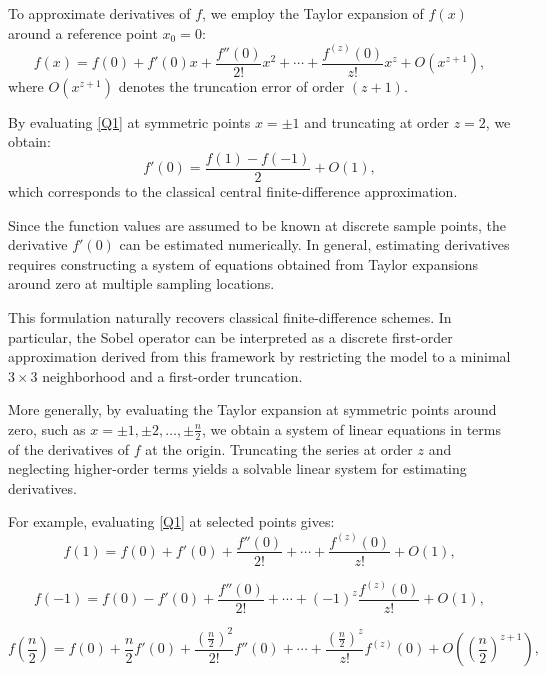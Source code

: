 \documentclass{elsarticle}
\begin{document}
To approximate derivatives of $f$, we employ the Taylor expansion of $f(x)$ around a reference point $x_0 = 0$:
\begin{equation}\label{Q1}
	f(x) = f(0) + f'(0)x + \frac{f''(0)}{2!}x^2 + \cdots + \frac{f^{(z)}(0)}{z!}x^z + O(x^{z+1}),
\end{equation}
where $O(x^{z+1})$ denotes the truncation error of order $(z+1)$.

By evaluating \eqref{Q1} at symmetric points $x = \pm 1$ and truncating at order $z = 2$, we obtain:
\begin{equation}\label{Q2}
	f'(0) = \frac{f(1) - f(-1)}{2} + O(1),
\end{equation}
which corresponds to the classical central finite-difference approximation.

Since the function values are assumed to be known at discrete sample points, the derivative $f'(0)$ can be estimated numerically. In general, estimating derivatives requires constructing a system of equations obtained from Taylor expansions around zero at multiple sampling locations.

This formulation naturally recovers classical finite-difference schemes. In particular, the Sobel operator can be interpreted as a discrete first-order approximation derived from this framework by restricting the model to a minimal $3 \times 3$ neighborhood and a first-order truncation.

More generally, by evaluating the Taylor expansion at symmetric points around zero, such as $x = \pm 1, \pm 2, \ldots, \pm \frac{n}{2}$, we obtain a system of linear equations in terms of the derivatives of $f$ at the origin. Truncating the series at order $z$ and neglecting higher-order terms yields a solvable linear system for estimating derivatives.

For example, evaluating \eqref{Q1} at selected points gives:
\begin{equation}\label{Q3}
	f(1) = f(0) + f'(0) + \frac{f''(0)}{2!} + \cdots + \frac{f^{(z)}(0)}{z!} + O(1),
\end{equation}

\begin{equation}\label{Q4}
	f(-1) = f(0) - f'(0) + \frac{f''(0)}{2!} + \cdots + (-1)^z \frac{f^{(z)}(0)}{z!} + O(1),
\end{equation}

\begin{equation}\label{Q5}
	f\left(\frac{n}{2}\right) = f(0) + \frac{n}{2} f'(0) + \frac{\left(\frac{n}{2}\right)^2}{2!} f''(0) + \cdots + \frac{\left(\frac{n}{2}\right)^z}{z!} f^{(z)}(0) + O\left(\left(\frac{n}{2}\right)^{z+1}\right),
\end{equation}
\end{document}
